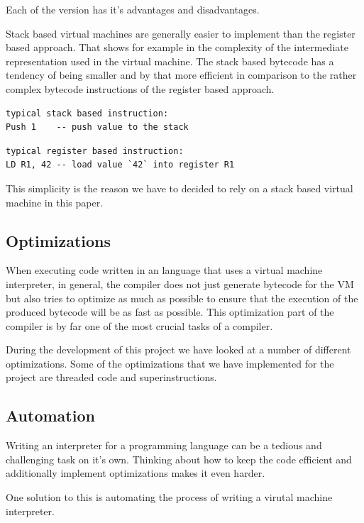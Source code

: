 \documentclass{article}
\begin{document}
Each of the version has it's advantages and disadvantages.

Stack based virtual machines are generally easier to implement than the register based approach.
That shows for example in the complexity of the intermediate representation used in the virtual 
machine. The stack based bytecode has a tendency of being smaller and by that more efficient in 
comparison to the rather complex bytecode instructions of the register based approach.

\begin{verbatim}
typical stack based instruction:
Push 1    -- push value to the stack
\end{verbatim}

\begin{verbatim}
typical register based instruction:
LD R1, 42 -- load value `42` into register R1
\end{verbatim}

This simplicity is the reason we have to decided to rely on a stack based virtual machine in
this paper.

\subsection{Optimizations}
When executing code written in an language that uses a virtual machine
interpreter, in general, the compiler does not just generate bytecode for the
VM but also tries to optimize as much as possible to ensure that the execution
of the produced bytecode will be as fast as possible. 
This optimization part of the compiler is by far one of the most crucial tasks
of a compiler.

During the development of this project we have looked at a number of different
optimizations. Some of the optimizations that we have implemented for the
project are threaded code and superinstructions.

\subsection{Automation}
Writing an interpreter for a programming language can be a tedious and
challenging task on it's own. Thinking about how to keep the code efficient and
additionally implement optimizations makes it even harder.

One solution to this is automating the process of writing a virutal machine
interpreter.
\end{document}

